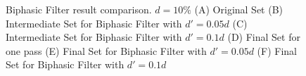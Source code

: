 \begin{figure}[H]
\begin{subfigure}[b]{1\linewidth}
\begin{subfigure}[b]{0.29\linewidth}
  	\caption{} 
  	\label{fig:bp10_2_sweden} 
  	\vspace{4ex}
  \end{subfigure}
\end{subfigure}
  \caption{Biphasic Filter result comparison. $d=10\%$
		   (A) Original Set
		   (B) Intermediate Set for Biphasic Filter with $d'=0.05d$ (C) Intermediate Set for Biphasic Filter with $d'=0.1d$ (D) Final Set for one pass
		   (E) Final Set for Biphasic Filter with $d'=0.05d$  
		   (F) Final Set for Biphasic Filter with $d'=0.1d$  
		   }
  \label{fig:bp_sweden} 
\end{figure}

